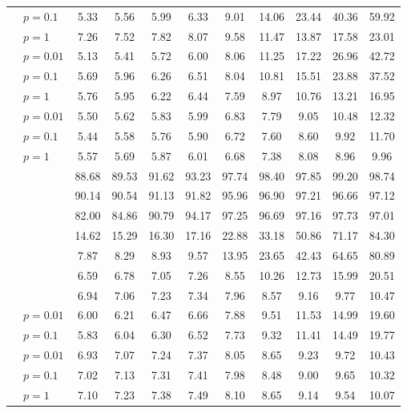 \begin{table}
\begin{tabular}{| c | l | c | c | c | c | c | c | c | c | c |}
		& \Random[$0.15$] $p{=}0.1$ & 5.33 & 5.56 & 5.99 & 6.33 & 9.01 & 14.06 & 23.44 & 40.36 & 59.92\\
		& \Random[$0.15$] $p{=}1$ & 7.26 & 7.52 & 7.82 & 8.07 & 9.58 & 11.47 & 13.87 & 17.58 & 23.01\\
		& \Random[$0.1$] $p{=}0.01$ & 5.13 & 5.41 & 5.72 & 6.00 & 8.06 & 11.25 & 17.22 & 26.96 & 42.72\\
		& \Random[$0.1$] $p{=}0.1$ & 5.69 & 5.96 & 6.26 & 6.51 & 8.04 & 10.81 & 15.51 & 23.88 & 37.52\\
		& \Random[$0.1$] $p{=}1$ & 5.76 & 5.95 & 6.22 & 6.44 & 7.59 & 8.97 & 10.76 & 13.21 & 16.95\\
		& \Random[$0.05$] $p{=}0.01$ & 5.50 & 5.62 & 5.83 & 5.99 & 6.83 & 7.79 & 9.05 & 10.48 & 12.32\\
		& \Random[$0.05$] $p{=}0.1$ & 5.44 & 5.58 & 5.76 & 5.90 & 6.72 & 7.60 & 8.60 & 9.92 & 11.70\\
		& \Random[$0.05$] $p{=}1$ & 5.57 & 5.69 & 5.87 & 6.01 & 6.68 & 7.38 & 8.08 & 8.96 & 9.96\\
		\hline
		\hline
		\multirow{11}{*}{\rotatebox{90}{$m = 2$ bit}} & \Quant & 88.68 & 89.53 & 91.62 & 93.23 & 97.74 & 98.40 & 97.85 & 99.20 & 98.74\\
		& \Clipping[$0.25$] & 90.14 & 90.54 & 91.13 & 91.82 & 95.96 & 96.90 & 97.21 & 96.66 & 97.12\\
		& \Clipping[$0.2$] & 82.00 & 84.86 & 90.79 & 94.17 & 97.25 & 96.69 & 97.16 & 97.73 & 97.01\\
		& \Clipping[$0.15$] & 14.62 & 15.29 & 16.30 & 17.16 & 22.88 & 33.18 & 50.86 & 71.17 & 84.30\\
		& \Clipping[$0.1$] & 7.87 & 8.29 & 8.93 & 9.57 & 13.95 & 23.65 & 42.43 & 64.65 & 80.89\\
		& \Clipping[$0.05$] & 6.59 & 6.78 & 7.05 & 7.26 & 8.55 & 10.26 & 12.73 & 15.99 & 20.51\\
		& \Clipping[$0.025$] & 6.94 & 7.06 & 7.23 & 7.34 & 7.96 & 8.57 & 9.16 & 9.77 & 10.47\\
		& \Random[$0.05$] $p{=}0.01$ & 6.00 & 6.21 & 6.47 & 6.66 & 7.88 & 9.51 & 11.53 & 14.99 & 19.60\\
		& \Random[$0.05$] $p{=}0.1$ & 5.83 & 6.04 & 6.30 & 6.52 & 7.73 & 9.32 & 11.41 & 14.49 & 19.77\\
		& \Random[$0.025$] $p{=}0.01$ & 6.93 & 7.07 & 7.24 & 7.37 & 8.05 & 8.65 & 9.23 & 9.72 & 10.43\\
		& \Random[$0.025$] $p{=}0.1$ & 7.02 & 7.13 & 7.31 & 7.41 & 7.98 & 8.48 & 9.00 & 9.65 & 10.32\\
		& \Random[$0.025$] $p{=}1$ & 7.10 & 7.23 & 7.38 & 7.49 & 8.10 & 8.65 & 9.14 & 9.54 & 10.07\\
		\hline
	\end{tabular}
\end{table}
